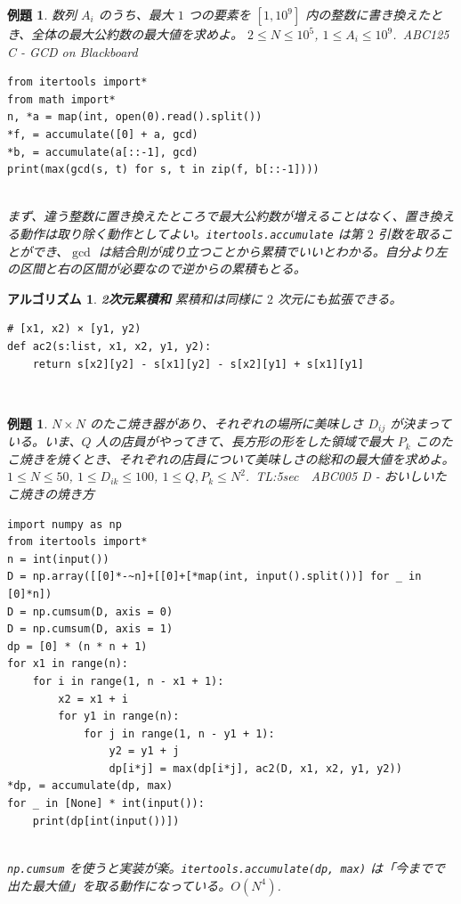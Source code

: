 \documentclass[12pt, a4j]{ltjsarticle}
\newtheorem{alg}[thm]{アルゴリズム}
\newtheorem{exm}[thm]{例題}
\begin{document}
\vspace{1cm}

\begin{exm} 数列 $A_i$ のうち、最大 $1$ つの要素を $[1,10^9]$ 内の整数に書き換えたとき、全体の最大公約数の最大値を求めよ。 $2\le N \le 10^5$, $1\le A_i \le 10^9$.\ \upshape ABC125 C - GCD on Blackboard\\
\begin{lstlisting}
from itertools import*
from math import*
n, *a = map(int, open(0).read().split())
*f, = accumulate([0] + a, gcd)
*b, = accumulate(a[::-1], gcd)
print(max(gcd(s, t) for s, t in zip(f, b[::-1])))
\end{lstlisting}\quad\\
まず、違う整数に置き換えたところで最大公約数が増えることはなく、置き換える動作は取り除く動作としてよい。\lstinline{itertools.accumulate} は第 $2$ 引数を取ることができ、$\gcd$ は結合則が成り立つことから累積でいいとわかる。自分より左の区間と右の区間が必要なので逆からの累積もとる。
\end{exm}

\newpage

\begin{alg} {\bf 2次元累積和} 累積和は同様に $2$ 次元にも拡張できる。\\\upshape
\begin{lstlisting}
# [x1, x2) × [y1, y2)
def ac2(s:list, x1, x2, y1, y2):
    return s[x2][y2] - s[x1][y2] - s[x2][y1] + s[x1][y1]
\end{lstlisting}\
\end{alg}

\vspace{1cm}

\begin{exm} $N\times N$ のたこ焼き器があり、それぞれの場所に美味しさ $D_{ij}$ が決まっている。いま、$Q$ 人の店員がやってきて、長方形の形をした領域で最大 $P_k$ このたこ焼きを焼くとき、それぞれの店員について美味しさの総和の最大値を求めよ。$1\le N \le 50$, $1\le D_{ik}\le 100$, $1\le Q,P_k \le N^2$.\upshape\ TL:5sec　ABC005 D - おいしいたこ焼きの焼き方\\
\begin{lstlisting}
import numpy as np
from itertools import*
n = int(input())
D = np.array([[0]*-~n]+[[0]+[*map(int, input().split())] for _ in [0]*n])
D = np.cumsum(D, axis = 0)
D = np.cumsum(D, axis = 1)
dp = [0] * (n * n + 1)
for x1 in range(n):
    for i in range(1, n - x1 + 1):
        x2 = x1 + i
        for y1 in range(n):
            for j in range(1, n - y1 + 1):
                y2 = y1 + j
                dp[i*j] = max(dp[i*j], ac2(D, x1, x2, y1, y2))
*dp, = accumulate(dp, max)
for _ in [None] * int(input()):
    print(dp[int(input())])
\end{lstlisting}
\quad\\
\lstinline{np.cumsum}
を使うと実装が楽。\lstinline{itertools.accumulate(dp, max)}
は「今までで出た最大値」を取る動作になっている。$O(N^4)$.
\end{exm}
\end{document}
